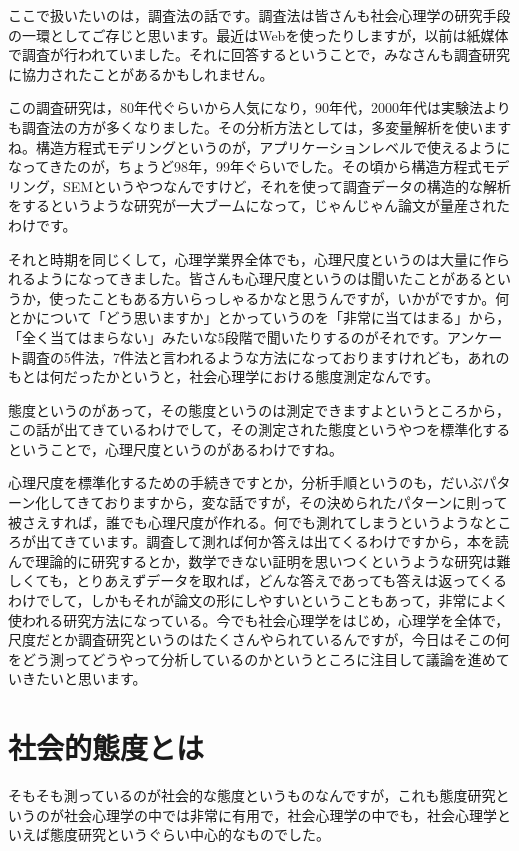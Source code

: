 \documentclass{ltjsbook}
\begin{document}
ここで扱いたいのは，調査法の話です。調査法は皆さんも社会心理学の研究手段の一環としてご存じと思います。最近はWebを使ったりしますが，以前は紙媒体で調査が行われていました。それに回答するということで，みなさんも調査研究に協力されたことがあるかもしれません。

この調査研究は，80年代ぐらいから人気になり，90年代，2000年代は実験法よりも調査法の方が多くなりました。その分析方法としては，多変量解析を使いますね。構造方程式モデリングというのが，アプリケーションレベルで使えるようになってきたのが，ちょうど98年，99年ぐらいでした。その頃から構造方程式モデリング，SEMというやつなんですけど，それを使って調査データの構造的な解析をするというような研究が一大ブームになって，じゃんじゃん論文が量産されたわけです。

それと時期を同じくして，心理学業界全体でも，心理尺度というのは大量に作られるようになってきました。皆さんも心理尺度というのは聞いたことがあるというか，使ったこともある方いらっしゃるかなと思うんですが，いかがですか。何とかについて「どう思いますか」とかっていうのを「非常に当てはまる」から，「全く当てはまらない」みたいな5段階で聞いたりするのがそれです。アンケート調査の5件法，7件法と言われるような方法になっておりますけれども，あれのもとは何だったかというと，社会心理学における態度測定なんです。

態度というのがあって，その態度というのは測定できますよというところから，この話が出てきているわけでして，その測定された態度というやつを標準化するということで，心理尺度というのがあるわけですね。

心理尺度を標準化するための手続きですとか，分析手順というのも，だいぶパターン化してきておりますから，変な話ですが，その決められたパターンに則って被さえすれば，誰でも心理尺度が作れる。何でも測れてしまうというようなところが出てきています。調査して測れば何か答えは出てくるわけですから，本を読んで理論的に研究するとか，数学できない証明を思いつくというような研究は難しくても，とりあえずデータを取れば，どんな答えであっても答えは返ってくるわけでして，しかもそれが論文の形にしやすいということもあって，非常によく使われる研究方法になっている。今でも社会心理学をはじめ，心理学を全体で，尺度だとか調査研究というのはたくさんやられているんですが，今日はそこの何をどう測ってどうやって分析しているのかというところに注目して議論を進めていきたいと思います。

\section{社会的態度とは}
そもそも測っているのが社会的な態度というものなんですが，これも態度研究というのが社会心理学の中では非常に有用で，社会心理学の中でも，社会心理学といえば態度研究というぐらい中心的なものでした。
\end{document}
